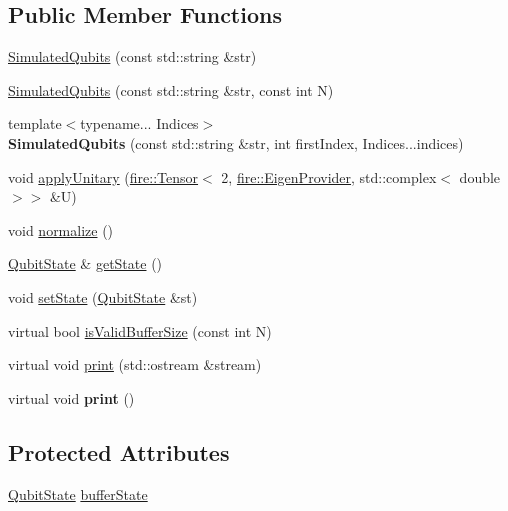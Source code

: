 \subsection*{Public Member Functions}
\begin{DoxyCompactItemize}
\item 
\hyperlink{a00279_afeb610fbd0c761caa15136e77260ba48}{Simulated\+Qubits} (const std\+::string \&str)
\item 
\hyperlink{a00279_a3d0f465d821565c582c37b6b4d7e4f79}{Simulated\+Qubits} (const std\+::string \&str, const int N)
\item 
{\footnotesize template$<$typename... Indices$>$ }\\{\bfseries Simulated\+Qubits} (const std\+::string \&str, int first\+Index, Indices...\+indices)\hypertarget{a00279_a9366eb77384fb1e9f34a693b9a7ea1b8}{}\label{a00279_a9366eb77384fb1e9f34a693b9a7ea1b8}

\item 
void \hyperlink{a00279_a97ecaaf5aab14bc017726fe9cfd41c46}{apply\+Unitary} (\hyperlink{a00299}{fire\+::\+Tensor}$<$ 2, \hyperlink{a00083}{fire\+::\+Eigen\+Provider}, std\+::complex$<$ double $>$$>$ \&U)
\item 
void \hyperlink{a00279_aea8a0358100e815a7c70eee7f8ba9d45}{normalize} ()
\item 
\hyperlink{a00299}{Qubit\+State} \& \hyperlink{a00279_a75b8fde8e812931fe087cb078108c00d}{get\+State} ()
\item 
void \hyperlink{a00279_a2a0e202f943d3ec8d848c7e25062c6e1}{set\+State} (\hyperlink{a00299}{Qubit\+State} \&st)
\item 
virtual bool \hyperlink{a00279_ac689b60b0218bf8d0c11ef2f151e7272}{is\+Valid\+Buffer\+Size} (const int N)
\item 
virtual void \hyperlink{a00279_ad9a39b44161fa0309167b9791ed10945}{print} (std\+::ostream \&stream)
\item 
virtual void {\bfseries print} ()\hypertarget{a00279_a7cda9427b5a0d3eaa9573eb9d992f51c}{}\label{a00279_a7cda9427b5a0d3eaa9573eb9d992f51c}

\end{DoxyCompactItemize}
\subsection*{Protected Attributes}
\begin{DoxyCompactItemize}
\item 
\hyperlink{a00299}{Qubit\+State} \hyperlink{a00279_ade9f334823890b3c0553800188ac3ef9}{buffer\+State}
\end{DoxyCompactItemize}


